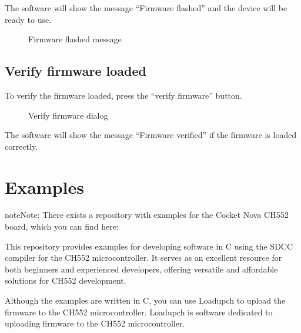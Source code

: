 \documentclass[letterpaper,10pt,english]{sphinxmanual}
\begin{document}
\sphinxAtStartPar
The software will show the message “Firmware flashed” and the device will be ready to use.

\begin{figure}[htbp]
\centering
\capstart

\noindent{}
\caption{Firmware flashed message}\label{\detokenize{usage:id5}}\label{\detokenize{usage:figure-success}}\end{figure}


\section{Verify firmware loaded}
\label{\detokenize{usage:verify-firmware-loaded}}
\sphinxAtStartPar
To verify the firmware loaded, press the “verify firmware” button.

\begin{figure}[htbp]
\centering
\capstart

\noindent{}
\caption{Verify firmware dialog}\label{\detokenize{usage:id6}}\label{\detokenize{usage:figure-verify}}\end{figure}

\sphinxAtStartPar
The software will show the message “Firmware verified” if the firmware is loaded correctly.

\sphinxstepscope


\chapter{Examples}
\label{\detokenize{examples:examples}}\label{\detokenize{examples::doc}}
\begin{sphinxadmonition}{note}{Note:}
\sphinxAtStartPar
There exists a repository with examples for the Cocket Nova CH552 board, which you can find here:
\begin{quote}


\end{quote}
\end{sphinxadmonition}

\sphinxAtStartPar
This repository provides examples for developing software in C using the SDCC compiler for the CH552 microcontroller. It serves as an excellent resource for both beginners and experienced developers, offering versatile and affordable solutions for CH552 development.

\sphinxAtStartPar
Although the examples are written in C, you can use Loadupch to upload the firmware to the CH552 microcontroller. Loadupch is software dedicated to uploading firmware to the CH552 microcontroller.
\end{document}

